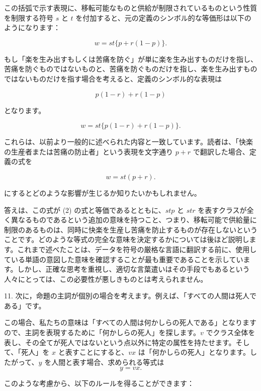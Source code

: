 \documentclass[a4paper,11pt,openany]{ltjsbook}
\begin{document}
この括弧で示す表現に、移転可能なものと供給が制限されているものという性質を制限する符号 $s$ と $t$ を付加すると、元の定義のシンボル的な等価形は以下のようになります：

\begin{equation}
w = st \{ p + r(1 - p) \}.
\end{equation}

もし「楽を生み出すもしくは苦痛を防ぐ」が単に楽を生み出すものだけを指し、苦痛を防ぐものではないものと、苦痛を防ぐものだけを指し、楽を生み出すものではないものだけを指す場合を考えると、定義のシンボル的な表現は

$$p(1 - r) + r(1 - p)$$

となります。

\begin{equation}
w = st\{p(1-r) + r(1-p)\}.
\end{equation}

これらは、以前より一般的に述べられた内容と一致しています。読者は、「快楽の生産者または苦痛の防止者」という表現を文字通り $p + r$ で翻訳した場合、定義の式を

\begin{equation}
w = st(p + r).
\end{equation}

にするとどのような影響が生じるか知りたいかもしれません。

答えは、この式が (2) の式と等価であるとともに、$stp$ と $str$ を表すクラスが全く異なるものであるという追加の意味を持つこと、つまり、移転可能で供給量に制限のあるものは、同時に快楽を生産し苦痛を防止するものが存在しないということです。どのような等式の完全な意味を決定するかについては後ほど説明します。これまで述べたことは、データを符号の厳格な言語に翻訳する前に、使用している単語の意図した意味を確認することが最も重要であることを示しています。しかし、正確な思考を重視し、適切な言葉遣いはその手段でもあるという人々にとっては、この必要性が悪しきものとは考えられません。

11. 次に，命題の主詞が個別の場合を考えます。例えば、「すべての人間は死人である」です。

この場合、私たちの意味は「すべての人間は何かしらの死人である」となりますので、主詞を表現するために「何かしらの死人」を探します。$v$ でクラス全体を表し、その全てが死人ではないという点以外に特定の属性を持たせます。そして、「死人」を $x$ と表すことにすると、$vx$ は「何かしらの死人」となります。したがって、$y$ を人間と表す場合、求められる等式は
\[
y = vx.
\]

このような考慮から、以下のルールを得ることができます：
\end{document}
